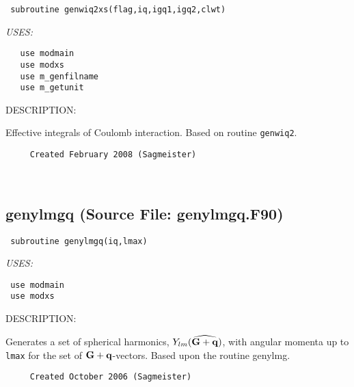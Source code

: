 \documentclass[11pt]{article}
\begin{document}
\begin{verbatim} subroutine genwiq2xs(flag,iq,igq1,igq2,clwt)\end{verbatim}{\em USES:}
\begin{verbatim}   use modmain
   use modxs
   use m_genfilname
   use m_getunit\end{verbatim}
{\sf DESCRIPTION:\\ }


     Effective integrals of Coulomb interaction. Based on routine {\tt genwiq2}.
  
\begin{verbatim}     Created February 2008 (Sagmeister)\end{verbatim}


 
 
\mbox{}\hrulefill\ 
 
\subsection{genylmgq (Source File: genylmgq.F90)}


\begin{verbatim} subroutine genylmgq(iq,lmax)\end{verbatim}{\em USES:}
\begin{verbatim} use modmain
 use modxs\end{verbatim}
{\sf DESCRIPTION:\\ }


     Generates a set of spherical harmonics, $Y_{lm}(\widehat{{\bf G}+{\bf q}})$,
     with angular
     momenta up to {\tt lmax} for the set of ${\bf G+q}$-vectors. Based upon
     the routine genylmg.
  
\begin{verbatim}     Created October 2006 (Sagmeister)\end{verbatim}





\end{document}

